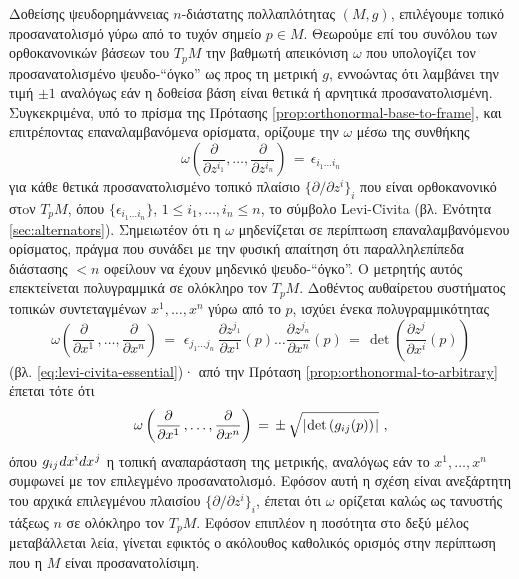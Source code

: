 \documentclass[11pt,a4paper,twoside,openright]{book}
\begin{document}
Δοθείσης ψευδορημάννειας $n$-διάστατης πολλαπλότητας $(Μ, g)$,
επιλέγουμε τοπικό προσανατολισμό γύρω από το τυχόν σημείο $p \in M$.
Θεωρούμε επί του συνόλου των ορθοκανονικών βάσεων του $T_pM$
την βαθμωτή απεικόνιση $\omega$
που υπολογίζει τον προσανατολισμένο ψευδο-``όγκο'' ως προς τη μετρική $g$,
εννοώντας ότι λαμβάνει την τιμή $\pm 1$
αναλόγως εάν η δοθείσα βάση είναι θετικά ή αρνητικά προσανατολισμένη. Συγκεκριμένα, υπό το πρίσμα της Πρότασης \ref{prop:orthonormal-base-to-frame},
και επιτρέποντας επαναλαμβανόμενα ορίσματα,
ορίζουμε την $\omega$ μέσω της συνθήκης
\begin{equation}\label{eq:levi-civita-primary-definition}
\omega
\left(
\frac{\partial}{\partial z^{i_1}},
\dots,
\frac{\partial}{\partial z^{i_n}}
\right)
\,
=
\,
\epsilon_{i_1 \dots i_n}
\end{equation}
για κάθε θετικά προσανατολισμένο τοπικό πλαίσιο $\{\partial/\partial z^i\}_i$
που είναι ορθοκανονικό στoν $Τ_pM$,
όπου $\{\epsilon_{i_1 \dots i_n}\}$, $1 \le i_1, \dots, i_n \le n$,
το σύμβολο Levi-Civita (βλ. Ενότητα \ref{sec:alternators}).
Σημειωτέον ότι η $\omega$ μηδενίζεται σε περίπτωση επαναλαμβανόμενου ορίσματος, πράγμα που συνάδει με την φυσική απαίτηση ότι παραλληλεπίπεδα διάστασης $< n$ οφείλουν να έχουν μηδενικό ψευδο-``όγκο''.
Ο μετρητής αυτός επεκτείνεται πολυγραμμικά σε ολόκληρο τον $Τ_pM$.
Δοθέντος αυθαίρετου συστήματος τοπικών συντεταγμένων $x^1, \dots, x^n$
γύρω από το $p$, ισχύει ένεκα πολυγραμμικότητας
\begin{equation*}
\omega
\left(
\frac{\partial}{\partial x^1}\,,
\dots,
\frac{\partial}{\partial x^n}
\right)
\,
=
\,
\,
\epsilon_{j_1 \dots j_n}
\,
\frac{\partial z^{j_1}}{\partial x^1}(p) \dots \frac{\partial z^{j_n}}{\partial x^n}(p)
\,
=
\,
\det\left( \frac{\partial z^j}{\partial x^i}(p) \right)
\end{equation*}
(βλ. \eqref{eq:levi-civita-essential})· από την Πρόταση \ref{prop:orthonormal-to-arbitrary} έπεται τότε ότι
\begin{equation*}
\omega
\left(
\frac{\partial}{\partial x^1}\,,
\dots,
\frac{\partial}{\partial x^n}
\right)
\,
=
\,
\pm
\,
\sqrt{\lvert\hspace{.75pt} \det \left(g_{ij}(p)\right) \hspace{.75pt}\rvert}\,\,,
\end{equation*}
όπου $g_{ij}\hspace{.5pt}dx^i dx^{\hspace{.5pt}j}$
η τοπική αναπαράσταση της μετρικής,
αναλόγως εάν το $x^1, \dots, x^n$ συμφωνεί με τον επιλεγμένο προσανατολισμό.
Εφόσον αυτή η σχέση είναι ανεξάρτητη
του αρχικά επιλεγμένου πλαισίου $\{\partial/\partial z^i\}_i$,
έπεται ότι $\omega$ ορίζεται καλώς ως τανυστής τάξεως $n$
σε ολόκληρο τον $T_pM$. Εφόσον επιπλέον η ποσότητα
στο δεξύ μέλος μεταβάλλεται λεία,
γίνεται εφικτός ο ακόλουθος καθολικός ορισμός στην περίπτωση που η $M$ είναι προσανατολίσιμη.
\end{document}
